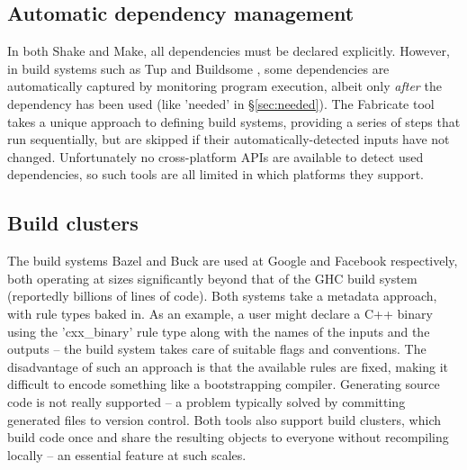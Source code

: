 \subsection{Automatic dependency management}

In both Shake and Make, all dependencies must be declared explicitly. However,
in build systems such as Tup \cite{tup} and Buildsome \cite{buildsome}, some
dependencies are automatically captured by monitoring program execution, albeit
only \emph{after} the dependency has been used (like \lst'needed' in
\S\ref{sec:needed}). The Fabricate tool \cite{fabricate} takes a unique approach
to defining build systems, providing a series of steps that run sequentially,
but are skipped if their automatically-detected inputs have not changed.
Unfortunately no cross-platform APIs are available to detect used dependencies,
so such tools are all limited in which platforms they support.

\subsection{Build clusters}

The build systems Bazel and Buck \cite{buck} are used at Google and Facebook respectively, both operating at sizes significantly beyond that of the GHC build system (reportedly billions of lines of code). Both systems take a metadata approach, with rule types baked in. As an example, a user might declare a C++ binary using the \lst'cxx_binary' rule type along with the names of the inputs and the outputs -- the build system takes care of suitable flags and conventions. The disadvantage of such an approach is that the available rules are fixed, making it difficult to encode something like a bootstrapping compiler. Generating source code is not really supported -- a problem typically solved by committing generated files to version control. Both tools also support build clusters, which build code once and share the resulting objects to everyone without recompiling locally -- an essential feature at such scales.
